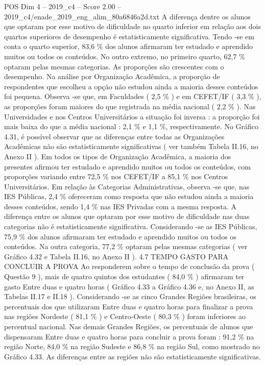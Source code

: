 \begin{textsample}{POS Dim 4 – 2019\_c4 – Score 2.00 – 2019\_c4/enade\_2019\_eng\_alim\_80a6846a2d.txt}
A diferença dentre os alunos que optaram por esse motivo de dificuldade no quarto inferior em relação aos dois quartos superiores de desempenho é estatisticamente significativa.
Tendo -se em conta o quarto superior, 83,6 \% dos alunos afirmaram ter estudado e aprendido muitos ou todos os conteúdos.
No outro extremo, no primeiro quarto, 62,7 \% optaram pelas mesmas categorias.
As proporções são crescentes com o desempenho.
Na análise por Organização Acadêmica, a proporção de respondentes que escolheu a opção não estudou ainda a maioria desses conteúdos foi pequena.
Observa -se que, em Faculdades ( 2,5 \% ) e em CEFET/IF ( 3,3 \% ), as proporções foram maiores do que registrada na média nacional ( 2,2 \% ).
Nas Universidades e nos Centros Universitários a situação foi inversa : a proporção foi mais baixa do que a média nacional : 2,1 \% e 1,1 \%, respectivamente.
No Gráfico 4.31, é possível observar que as diferenças entre todas as Organizações Acadêmicas não são estatisticamente significativas ( ver também Tabela II.16, no Anexo II ).
Em todos os tipos de Organização Acadêmica, a maioria dos presentes afirmou ter estudado e aprendido muitos ou todos os conteúdos, com proporções variando entre 72,5 \% nos CEFET/IF a 85,1 \% nos Centros Universitários.
Em relação às Categorias Administrativas, observa -se que, nas IES Públicas, 2,4 \% ofereceram como resposta que não estudou ainda a maioria desses conteúdos, sendo 1,4 \% nas IES Privadas com a mesma resposta.
A diferença entre os alunos que optaram por esse motivo de dificuldade nas duas categorias não é estatisticamente significativa.
Considerando -se as IES Públicas, 75,9 \% dos alunos afirmaram ter estudado e aprendido muitos ou todos os conteúdos.
Na outra categoria, 77,2 \% optaram pelas mesmas categorias ( ver Gráfico 4.32 e Tabela II.16, no Anexo II ). 4.7 TEMPO GASTO PARA CONCLUIR A PROVA Ao responderem sobre o tempo de conclusão da prova ( Questão 9 ), mais de quatro quintos dos estudantes ( 84,0 \% ) afirmaram ter gasto Entre duas e quatro horas ( Gráfico 4.33 a Gráfico 4.36 e, no Anexo II, as Tabelas II.17 e II.18 ).
Considerando -se as cinco Grandes Regiões brasileiras, os percentuais dos que utilizaram Entre duas e quatro horas para finalizar a prova nas regiões Nordeste ( 81,1 \% ) e Centro-Oeste ( 80,3 \% ) foram inferiores ao percentual nacional.
Nas demais Grandes Regiões, os percentuais de alunos que dispensaram Entre duas e quatro horas para concluir a prova foram : 91,2 \% na região Norte, 84,0 \% na região Sudeste e 86,8 \% na região Sul, como mostrado no Gráfico 4.33.
As diferenças entre as regiões não são estatisticamente significativas.

\end{textsample}
